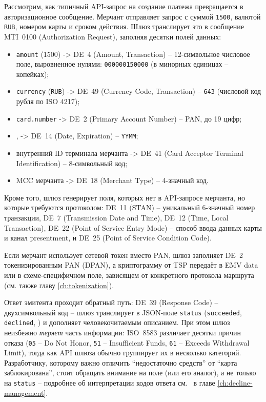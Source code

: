 Рассмотрим, как типичный API-запрос на создание платежа
превращается в авторизационное сообщение. Мерчант отправляет
запрос с суммой \texttt{1500}, валютой \texttt{RUB},
номером карты и сроком действия. Шлюз транслирует это в сообщение
MTI~0100 (Authorization Request), заполняя десятки полей
данных:

\begin{itemize}
  \item \texttt{amount} (1500) -> DE~4 (Amount, Transaction) --
        12-символьное числовое поле, выровненное нулями:
        \texttt{000000150000} (в минорных единицах -- копейках);
  \item \texttt{currency} (\texttt{RUB}) -> DE~49 (Currency Code,
        Transaction) -- \texttt{643} (числовой код рубля по ISO 4217);
  \item \texttt{card.number} -> DE~2 (Primary Account Number) --
        PAN, до 19 цифр;
  \item {},  ->
        DE~14 (Date, Expiration) -- \texttt{YYMM};
  \item внутренний ID терминала мерчанта -> DE~41 (Card Acceptor
        Terminal Identification) -- 8-символьный код;
  \item MCC мерчанта -> DE~18 (Merchant Type) -- 4-значный код.
\end{itemize}
Кроме того, шлюз генерирует поля, которых нет в API-запросе
мерчанта, но которые требуются протоколом: DE~11 (STAN) --
уникальный 6-значный номер транзакции, DE~7 (Transmission Date
and Time), DE~12 (Time, Local Transaction), DE~22 (Point
of Service Entry Mode) -- способ ввода данных карты
и канал presentment, и DE~25 (Point of Service Condition Code).

Если мерчант использует сетевой токен вместо PAN, шлюз заполняет
DE~2 токенизированным PAN (DPAN), а криптограмму от TSP
передаёт в EMV data или в схеме-специфичном поле, зависящем
от конкретного протокола маршрута~\cite{emvco-payment-tokenisation-guide}
(см. также главу \ref{ch:tokenization}).

Ответ эмитента проходит обратный путь: DE~39 (Response Code) --
двухсимвольный код -- шлюз транслирует в JSON-поле
\texttt{status} (\texttt{succeeded}, \texttt{declined},
) и дополняет человекочитаемым
описанием. При этом шлюз неизбежно \emph{теряет} часть
информации: ISO~8583 различает десятки причин отказа (\texttt{05} --
Do Not Honor, \texttt{51} -- Insufficient Funds, \texttt{61} -- Exceeds
Withdrawal Limit), тогда как API шлюза обычно группирует их
в несколько категорий. Разработчику, которому важно отличить
\enquote{недостаточно средств} от \enquote{карта заблокирована},
стоит обращать внимание на поле 
(или его аналог), а не только на \texttt{status} --
подробнее об интерпретации кодов ответа см.~\cite{mc-tpr}
в главе \ref{ch:decline-management}.

